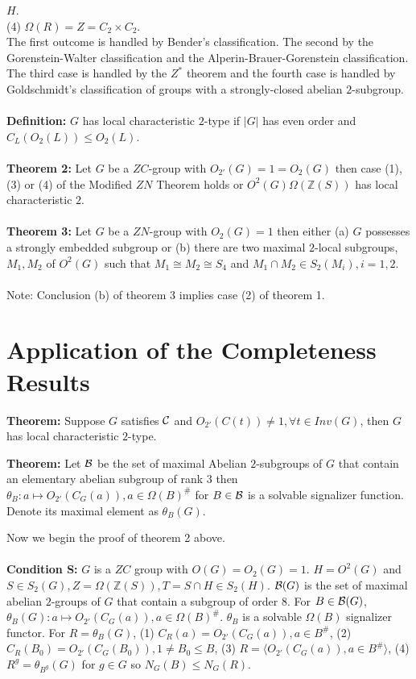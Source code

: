$H$.\\
(4) $\Omega(R)=Z= C_2 \times C_2$.
\\
The first outcome is handled by Bender's classification.  The second by the Gorenstein-Walter
classification and the Alperin-Brauer-Gorenstein classification.  The third case is handled by the $Z^*$
theorem and the fourth case is handled by Goldschmidt's classification of groups with a strongly-closed
abelian $2$-subgroup.
\\
\\
{\bf Definition:}  $G$ has local characteristic $2$-type if $|G|$ has even order and
$C_L(O_2(L)) \leq O_2(L)$.
\\
\\
{\bf Theorem 2:}  Let $G$ be a $ZC$-group with $O_{2'}(G)=1=O_2(G)$ then case (1), (3) or (4)
of the Modified $ZN$ Theorem holds or $O^2(G) \Omega({\mathbb Z}(S))$ has local characteristic $2$.
\\
\\
{\bf Theorem 3:} Let $G$ be a $ZN$-group with $O_2(G)= 1$ then either (a)
$G$ possesses a strongly embedded subgroup or (b) there are two maximal $2$-local subgroups,
$M_1, M_2$ of $O^2(G)$ such that $M_1 \cong M_2 \cong S_4$ and $M_1 \cap M_2 \in S_2(M_i), i = 1,2$.
\\
\\
Note: Conclusion (b) of theorem 3 implies case (2) of theorem 1.
\section{Application of the Completeness Results}
{\bf Theorem:}  Suppose $G$ satisfies ${\cal C}$ and $O_{2'}(C(t)) \ne 1, \forall t \in Inv(G)$,
then $G$ has local characteristic $2$-type.
\begin{quote}
\end{quote}
{\bf Theorem:} Let ${\cal B}$ be the set of maximal Abelian $2$-subgroups of $G$ that contain
an elementary abelian subgroup of rank $3$ then 
$\theta_B: a \mapsto O_{2'}(C_G(a)), a \in \Omega(B)^{\#}$ for $B \in {\cal B}$ is a solvable
signalizer function.  Denote its maximal element as $\theta_B(G)$.
\begin{quote}
\end{quote}
Now we begin the proof of theorem 2 above.
\\
\\
{\bf Condition {\cal S}:}  $G$ is a $ZC$ group with $O(G)= O_2(G)=1$.
$H=O^2(G)$ and
$S \in S_2(G), Z= \Omega({\mathbb Z}(S)), T= S \cap H \in S_2(H)$. ${\cal B}(G)$ is the set
of maximal abelian $2$-groups of $G$ that contain a subgroup of order $8$.   For $B \in {\cal B}(G)$,
$\theta_B(G): a \mapsto O_{2'}(C_G(a)), a \in \Omega(B)^\#$.  $\theta_B$ is a solvable $\Omega(B)$
signalizer functor.  For $R = \theta_B(G)$, (1) $C_R(a) = O_{2'}(C_G(a)), a \in B^\#$,
(2) $C_R(B_0) = O_{2'}(C_G(B_0)), 1 \neq B_0 \leq B$, (3) $R= \langle O_{2'}(C_G(a)), a \in B^\# \rangle$,
(4) $R^g = \theta_{B^g}(G)$ for $g \in G$ so $N_G(B) \leq N_G(R)$.
\\
\\
